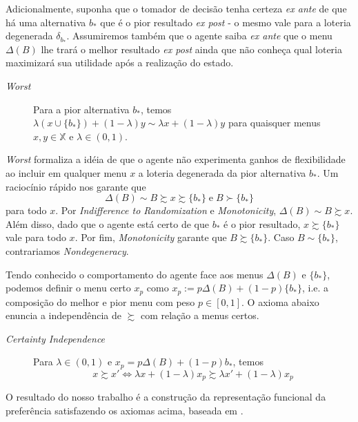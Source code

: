 \documentclass[11pt, a4paper]{article}
\theoremstyle{nonumberplain}
\theoremstyle{plain}
\theoremstyle{plain}
\theoremstyle{plain}
\begin{document}
Adicionalmente, suponha que o tomador de decisão tenha certeza \textit{ex ante} de que há uma alternativa $b_*$ que é o pior resultado \textit{ex post} - o mesmo vale para a loteria degenerada $\delta_{b_*}$. Assumiremos também que o agente saiba \textit{ex ante} que o menu $\Delta(B)$ lhe trará o melhor resultado \textit{ex post} ainda que não conheça qual loteria maximizará sua utilidade após a realização do estado.   

\begin{description}
\item[\textit{Worst}] Para a pior alternativa $b_*$, temos $\lambda\left(x\cup \{b_*\}\right)+(1-\lambda)y\sim \lambda x + (1-\lambda)y$ para quaisquer menus $x,y\in \mathbb{X}$ e $\lambda\in (0,1)$. 
\end{description}

\textit{Worst} formaliza a idéia de que o agente não experimenta ganhos de flexibilidade ao incluir  em qualquer menu $x$ a loteria degenerada da pior alternativa $b_*$. Um raciocínio rápido nos garante que $$\Delta(B)\sim B\succsim x\succsim \{b_*\} \; \text{e} \; B\succ \{b_*\}$$ para todo $x$. Por \textit{Indifference to Randomization} e \textit{Monotonicity}, $\Delta(B)\sim B \succsim x$. Além disso, dado que o agente está certo de que $b_*$ é o pior resultado, $x\succsim \{b_*\}$ vale para todo $x$. Por fim, \textit{Monotonicity} garante que $B\succsim \{b_*\}$. Caso $B \sim \{b_*\}$, contrariamos \textit{Nondegeneracy}. 

Tendo conhecido o comportamento do agente face aos menus $\Delta(B)$ e $\{b_*\}$, podemos definir o menu certo $x_p$ como $x_p:=p\Delta(B)+(1-p)\{b_*\}$, i.e. a composição do melhor e pior menu com peso $p\in [0,1]$. O axioma abaixo enuncia a independência de $\succsim$ com relação a menus certos.

\begin{description}
\item [\textit{Certainty Independence}] Para $\lambda\in (0,1)$ e $x_p=p\Delta(B)+(1-p)b_*$, temos $$x\succsim x' \Leftrightarrow \lambda x +(1-\lambda)x_p\succsim \lambda x' + (1-\lambda)x_p$$ 

\end{description}

O resultado do nosso trabalho é a construção da representação funcional da preferência satisfazendo os axiomas acima, baseada em \cite{Epstein2007}.
\end{document}
